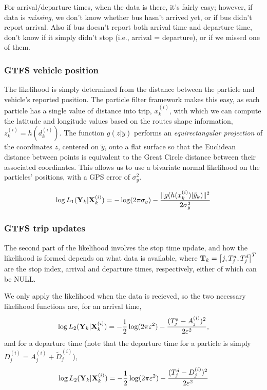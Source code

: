 \documentclass[draftcls,a4paper,onecolumn]{IEEEtran}\usepackage[]{graphicx}\usepackage[]{color}
\begin{document}
For arrival/departure times, when the data is there, it's fairly easy;
however, if data is \emph{missing}, we don't know whether bus hasn't arrived yet,
or if bus didn't report arrival.
Also if bus doesn't report both arrival time and departure time,
don't know if it simply didn't stop (i.e., arrival = departure),
or if we missed one of them.


\subsubsection{GTFS vehicle position}
The likelihood is simply determined from the distance between the particle and 
vehicle's reported position.
The particle filter framework makes this easy,
as each particle has a single value of distance into trip, $x_k^{(i)}$,
with which we can compute the latitude and longitude values based on 
the routes shape information, $z_k^{(i)} = h(d_k^{(i)})$.
The function $g (z | \tilde y)$ performs an \emph{equirectangular projection} 
\cite{Snyder_1998}
of the coordinates $z$, centered on $\tilde y$, 
onto a flat surface so that the Euclidean distance between points is equivalent
to the Great Circle distance between their associated coordinates.
This allows us to use a bivariate normal likelihood on the particles' positions,
with a GPS error of $\sigma_y^2$.

\begin{equation}
  \label{eq:l1}
  \log L_1 (\mathbf{Y}_k | \mathbf{X}_k^{(i)})
  = - \log(2\pi\sigma_y) - \frac{\|g(h(x_k^{(i)})|\tilde y_k)\|^2}{2\sigma_y^2}
\end{equation}


\subsubsection{GTFS trip updates}
The second part of the likelihood involves the stop time update,
and how the likelihood is formed depends on what data is available,
where $\mathbf{T}_k = \left[ j, T^a_j , T^d_j \right]^T$ 
are the stop index, arrival and departure times,
respectively, either of which can be NULL.

We only apply the likelihood when the data is recieved, 
so the two necessary likelihood functions are,
for an arrival time,
\begin{equation}
  \label{eq:l2a}
  \log L_2 (\mathbf{Y}_k | \mathbf{X}_k^{(i)})
  = - \frac{1}{2}\log (2\pi\varepsilon^2) - 
  \frac{(T_j^a - A_j^{(i)})^2}{2\varepsilon^2},
\end{equation}
and for a departure time
(note that the departure time for a particle
is simply $D_j^{(i)} = A_j^{(i)} + \tilde D_j^{(i)}$),
\begin{equation}
  \label{eq:l2d}
  \log L_2 (\mathbf{Y}_k | \mathbf{X}_k^{(i)})
  = - \frac{1}{2}\log (2\pi\varepsilon^2) - 
  \frac{(T_j^d - D_j^{(i)})^2}{2\varepsilon^2}
\end{equation}
\end{document}
